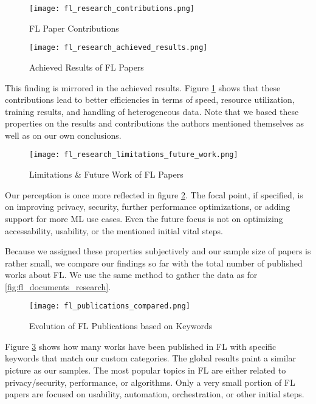 \begin{figure}[p]
    \centering
    \texttt{[image: fl\_research\_contributions.png]}
    \caption{FL Paper Contributions}
    \label{fig:fl_research_contributions}

    \texttt{[image: fl\_research\_achieved\_results.png]}
    \caption{Achieved Results of FL Papers}
    \label{fig:fl_research_achieved_results}
\end{figure}

This finding is mirrored in the achieved results.
Figure \ref{fig:fl_research_achieved_results} shows that these contributions
lead to better efficiencies in terms of speed, resource utilization, training results,
and handling of heterogeneous data.
Note that we based these properties on the results and contributions the authors mentioned themselves
as well as on our own conclusions.

\begin{figure}[h]
    \centering
    \texttt{[image: fl\_research\_limitations\_future\_work.png]}
    \caption{Limitations \& Future Work of FL Papers}
    \label{fig:fl_research_limitations_future_work}
\end{figure}

Our perception is once more reflected in figure \ref{fig:fl_research_limitations_future_work}.
The focal point, if specified, is on improving privacy, security, further performance optimizations, or adding support for more ML use cases.
Even the future focus is not on optimizing accessability, usability, or the mentioned initial vital steps.

Because we assigned these properties subjectively and our sample size of papers is rather small,
we compare our findings so far with the total number of published works about FL.
We use the same method to gather the data as for \ref{fig:fl_documents_research}.

\begin{figure}[h]
    \centering
    \texttt{[image: fl\_publications\_compared.png]}
    \caption{Evolution of FL Publications based on Keywords}
    \label{fig:fl_publications_compared}
\end{figure}


Figure \ref{fig:fl_publications_compared} shows how many works have been published in FL with
specific keywords that match our custom categories.
The global results paint a similar picture as our samples.
The most popular topics in FL are either related to privacy/security, performance,
or algorithms.
Only a very small portion of FL papers are focused on usability, automation, orchestration,
or other initial steps.

